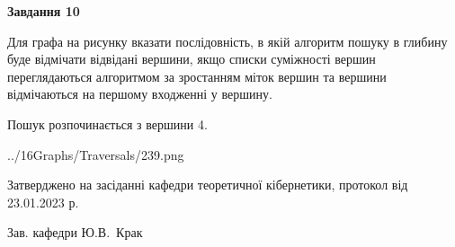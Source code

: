 \documentclass[12pt, ukrainian]{article}
\begin{document}
{\begin {large}
{\begin {center}\textbf{Завдання 10}\end {center}}\par
Для графа на рисунку вказати послідовність, в якій алгоритм пошуку в глибину буде відмічати відвідані вершини, якщо списки суміжності вершин переглядаються алгоритмом за зростанням міток вершин та вершини відмічаються на першому вход\-женні у вершину.\par
Пошук розпочинається з вершини 4.\par

\begin{center}
	{../16Graphs/Traversals/239.png}
\end{center}\par
\newpage


\end {large}
}
{\smallskip \begin {small} Затверджено на засіданні кафедри теоретичної кібернетики, протокол  від   23.01.2023 р.\par\smallskip\smallskip
{\parbox {6.5 cm}{Зав. кафедри \dotfill Ю.В.~Крак}} \end{small}}
\end{document}
